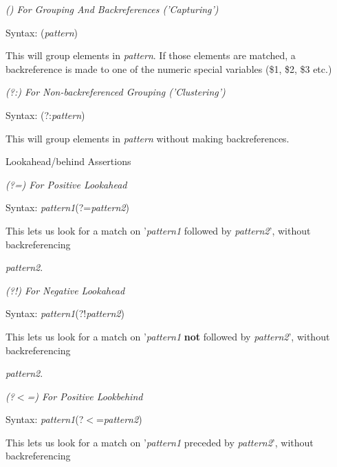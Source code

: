 \documentclass[a4paper,11pt]{book}
\begin{document}
\noindent \eject 

\noindent 

\noindent \textit{() For Grouping And Backreferences ('Capturing')}

\noindent Syntax: (\textit{pattern})

\noindent 

\noindent This will group elements in \textit{pattern}. If those elements are matched, a backreference is made to one of the numeric special variables (\$1, \$2, \$3 etc.)

\noindent 

\noindent \textit{(?:) For Non-backreferenced Grouping ('Clustering')}

\noindent Syntax: (?:\textit{pattern})

\noindent 

\noindent This will group elements in \textit{pattern }without making backreferences.

\noindent 

\noindent Lookahead/behind Assertions

\noindent 

\noindent 

\noindent \textit{(?=) For Positive Lookahead}

\noindent Syntax: \textit{pattern1}(?=\textit{pattern2})

\noindent 

\noindent This lets us look for a match on '\textit{pattern1 }followed by \textit{pattern2}', without backreferencing

\noindent \textit{pattern2}.

\noindent 

\noindent \textit{(?!) For Negative Lookahead}

\noindent Syntax: \textit{pattern1}(?!\textit{pattern2})

\noindent 

\noindent This lets us look for a match on '\textit{pattern1 }\textbf{not }followed by \textit{pattern2}', without backreferencing

\noindent \textit{pattern2}.

\noindent 

\noindent \textit{(?$<$=) For Positive Lookbehind}

\noindent Syntax: \textit{pattern1}(?$<$=\textit{pattern2})

\noindent 

\noindent This lets us look for a match on '\textit{pattern1 }preceded by \textit{pattern2}', without backreferencing
\end{document}

